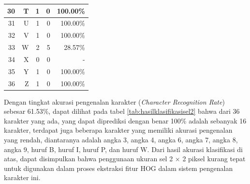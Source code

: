 \begin{longtable}[c]{|r|r|r|r|r|}
	30           & T                 & 1                       & 0                       &100.00\%            \\ \hline
	31           & U                 & 1                       & 0                       &100.00\%            \\ \hline
	32           & V                 & 1                       & 0                       &100.00\%            \\ \hline
	33           & W                 & 2                       & 5                       &28.57\%            \\ \hline
	34           & X                 & 0                       & 0                       & -            \\ \hline
	35           & Y                 & 1                       & 0                       &100.00\%            \\ \hline
	36           & Z                 & 1                       & 0                       &100.00\%            \\ \hline
\end{longtable}

\noindent Dengan tingkat akurasi pengenalan karakter (\textit{Character Recognition Rate}) sebesar 61.53\%, dapat dilihat pada tabel \ref{tab:hasilklasifikasisel2} bahwa dari 36  karakter yang ada, yang dapat diprediksi dengan benar 100\% adalah sebanyak 16 karakter, terdapat juga beberapa karakter yang memiliki akurasi pengenalan yang rendah, diantaranya adalah angka 3, angka 4, angka 6, angka 7, angka 8, angka 9, huruf B, huruf I, huruf P, dan huruf W. Dari hasil akurasi klasifikasi di atas, dapat disimpulkan bahwa penggunaan ukuran sel 2 $\times$ 2 piksel kurang tepat untuk digunakan dalam proses ekstraksi fitur HOG dalam sistem pengenalan karakter ini.

